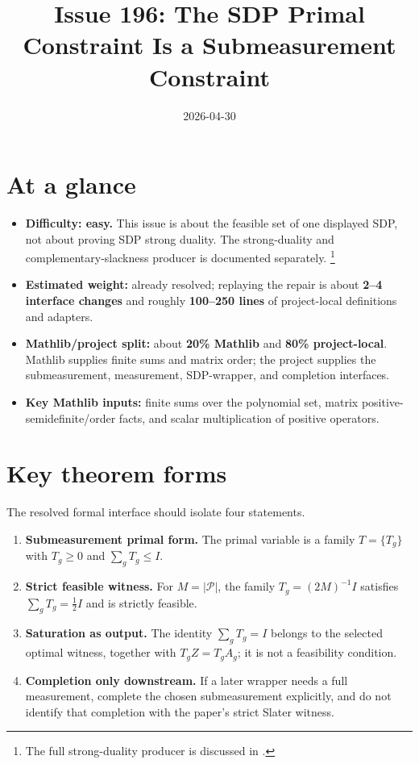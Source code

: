 \documentclass[11pt]{article}
\title{Issue 196: The SDP Primal Constraint Is a Submeasurement Constraint}
\author{}
\date{2026-04-30}
\newcommand{\cP}{\mathcal P}
\begin{document}
\maketitle

\section{At a glance}

\begin{itemize}
  \item \textbf{Difficulty: easy.} This issue is about the feasible set of one
  displayed SDP, not about proving SDP strong duality. The strong-duality and
  complementary-slackness producer is documented separately.%
  \footnote{The full strong-duality producer is discussed in
  .}
  \item \textbf{Estimated weight:} already resolved; replaying the repair is about
  \textbf{2--4 interface changes} and roughly \textbf{100--250 lines} of
  project-local definitions and adapters.
  \item \textbf{Mathlib/project split:} about \textbf{20\% Mathlib} and
  \textbf{80\% project-local}. Mathlib supplies finite sums and matrix order;
  the project supplies the submeasurement, measurement, SDP-wrapper, and
  completion interfaces.
  \item \textbf{Key Mathlib inputs:} finite sums over the polynomial set, matrix
  positive-semidefinite/order facts, and scalar multiplication of positive
  operators.
\end{itemize}

\section{Key theorem forms}

The resolved formal interface should isolate four statements.

\begin{enumerate}
  \item \textbf{Submeasurement primal form.} The primal variable is a family
  $T=\{T_g\}$ with $T_g\ge0$ and $\sum_gT_g\le I$.
  \item \textbf{Strict feasible witness.} For $M=|\cP|$, the family
  $T_g=(2M)^{-1}I$ satisfies $\sum_gT_g=\frac12 I$ and is strictly feasible.
  \item \textbf{Saturation as output.} The identity $\sum_gT_g=I$ belongs to the
  selected optimal witness, together with $T_gZ=T_gA_g$; it is not a feasibility
  condition.
  \item \textbf{Completion only downstream.} If a later wrapper needs a full
  measurement, complete the chosen submeasurement explicitly, and do not identify
  that completion with the paper's strict Slater witness.
\end{enumerate}
\end{document}
